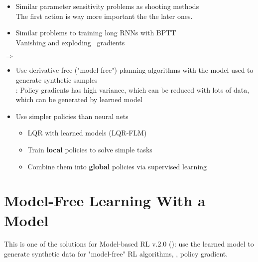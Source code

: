\begin{itemize}
	\item Similar parameter sensitivity problems as shooting methods\\
	The first action is way more important the the later ones.
	\item Similar problems to training long \ac{RNN}s with \ac{BPTT}\\
	Vanishing and exploding \ gradients
\end{itemize}

$\Rightarrow$ 
\begin{itemize}
	\item Use derivative-free ("model-free") planning algorithms with the model used to generate synthetic samples\\
	\Eg: Policy gradients has high variance, which can be reduced with lots of data, which can be generated by learned model
	\item Use simpler policies than neural nets
	\begin{itemize}
		\item \ac{LQR} with learned models (\ac{LQR}-\ac{FLM})
		\item Train \textbf{local} policies to solve simple tasks
		\item Combine them into \textbf{global} policies via supervised learning
	\end{itemize}
\end{itemize}

\section{Model-Free Learning With a Model}
This is one of the solutions for Model-based \ac{RL} v.2.0 (): use the learned model to generate synthetic data for "model-free" \ac{RL} algorithms, \eg, policy gradient. \cite{parmas2018icml}

